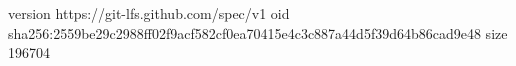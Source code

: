 version https://git-lfs.github.com/spec/v1
oid sha256:2559be29c2988ff02f9acf582cf0ea70415e4c3c887a44d5f39d64b86cad9e48
size 196704
